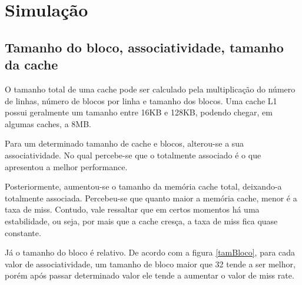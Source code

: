 \documentclass[12pt,a4paper]{article}
\begin{document}

\section{Simulação}

\subsection{Tamanho do bloco, associatividade, tamanho da cache}
\label{sec1}
O tamanho total de uma cache pode ser calculado pela multiplicação do
número de linhas, número de blocos por linha e tamanho dos blocos.
Uma cache L1 possui geralmente um tamanho entre 16KB e 128KB, podendo chegar, em algumas caches, a 8MB.

Para um determinado tamanho de cache e blocos, alterou-se a sua
associatividade. No qual percebe-se que o totalmente associado é o que
apresentou a melhor performance.

Posteriormente, aumentou-se o tamanho da memória cache total, deixando-a totalmente associada.
Percebeu-se que quanto maior a memória cache, menor é a taxa de miss. Contudo, vale ressaltar que
em certos momentos há uma estabilidade, ou seja, por mais que a cache cresça, a taxa de miss fica quase
constante.

Já o tamanho do bloco é relativo. De acordo com a figura \ref{tamBloco}, para cada valor de associatividade, um tamanho de bloco maior que 32
tende a ser melhor, porém após passar determinado valor ele tende a aumentar o valor de miss rate.

\end{document}
